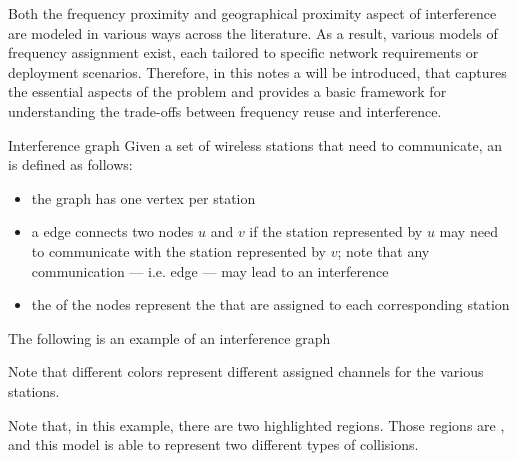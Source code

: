 \documentclass[a4paper, 12pt]{report}
\begin{document}
    Both the frequency proximity and geographical proximity aspect of interference are modeled in various ways across the literature. As a result, various models of frequency assignment exist, each tailored to specific network requirements or deployment scenarios. Therefore, in this notes a  will be introduced, that captures the essential aspects of the problem and provides a basic framework for understanding the trade-offs between frequency reuse and interference.

    \begin{frameddefn}{Interference graph}
        Given a set of wireless stations that need to communicate, an  is defined as follows:

        \begin{itemize}
            \item the graph has one vertex per station
            \item a  edge connects two nodes $u$ and $v$ if the station represented by $u$ may need to communicate with the station represented by $v$; note that any communication --- i.e. edge --- may lead to an interference
            \item the  of the nodes represent the  that are assigned to each corresponding station
        \end{itemize}
    \end{frameddefn}

    \begin{example}
        The following is an example of an interference graph


        Note that different colors represent different assigned channels for the various stations.
    \end{example}

    Note that, in this example, there are two highlighted regions. Those regions are , and this model is able to represent two different types of collisions.
\end{document}
